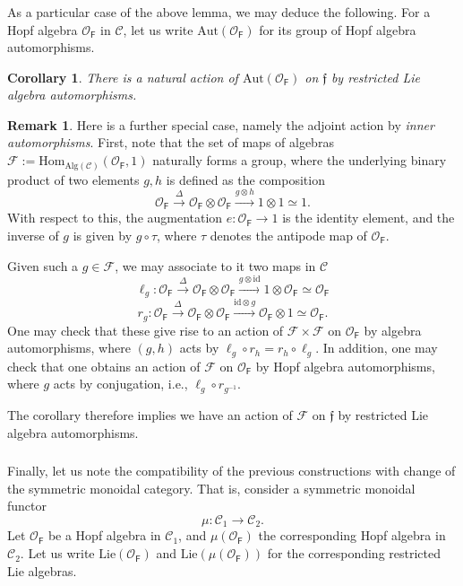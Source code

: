 \documentclass{amsart}
\newtheorem{Cor}[Thm]{Corollary}
\theoremstyle{definition}
\newtheorem{Rem}[Thm]{Remark}
\newcommand{\OOF}{\OO_{\mathsf{F}}}
\newcommand{\sC}{\mathscr{C}}
\newcommand{\sss}{\subsubsection{}}
\newcommand{\OO}{\mathscr{O}}
\newcommand{\Hom}{\on{Hom}}
\newcommand{\on}{\mathrm}
\newcommand{\ff}{\mathfrak{f}}
\numberwithin{equation}{section}
\begin{document}
\sss As a particular case of the above lemma, we may deduce the following. For a Hopf algebra $\OOF$ in $\sC$, let us write $\on{Aut}(\OOF)$ for its group of Hopf algebra automorphisms. 

\begin{Cor}\label{c:ernie} There is a natural action of $\on{Aut}(\OOF)$ on $\ff$ by restricted Lie algebra automorphisms.     
\end{Cor}


\begin{Rem} Here is a further special case, namely the adjoint action by {\em inner automorphisms}. First, note that the set of maps of algebras $\mathscr{F} := \Hom_{\on{Alg}(\sC)}(\OOF, 1)$ naturally forms a group, where the underlying binary product of two elements $g, h$ is defined as the composition 
$$\OOF \xrightarrow{\Delta} \OOF \otimes \OOF \xrightarrow{g \otimes h} 1 \otimes 1 \simeq 1.$$
With respect to this, the augmentation $e: \OOF \rightarrow 1$ is the identity element, and the inverse of $g$ is given by $g \circ \tau$, where $\tau$ denotes the antipode map of $\OOF$.

Given such a $g \in \mathscr{F}$, we may associate to it two maps in $\sC$
$$\ell_g: \OOF \xrightarrow{\Delta} \OOF \otimes \OOF \xrightarrow{g \otimes \on{id}} 1 \otimes \OOF \simeq \OOF$$
$$r_g: \OOF \xrightarrow{\Delta} \OOF \otimes \OOF \xrightarrow{\on{id} \otimes g} \OOF \otimes 1 \simeq \OOF.$$
One may check that these give rise to an action of $\mathscr{F} \times \mathscr{F}$ on $\OOF$ by algebra automorphisms, where $(g,h)$ acts by $\ell_g \circ r_h = r_h \circ \ell_g.$ In addition, one may check that one obtains an action of $\mathscr{F}$ on $\OOF$ by Hopf algebra automorphisms, where $g$ acts by conjugation, i.e., $\ell_g \circ r_{g^{-1}}.$

The corollary therefore implies we have an action of $\mathscr{F}$ on $\ff$ by restricted Lie algebra automorphisms. 
\end{Rem}






\sss Finally, let us note the compatibility of the previous constructions with change of the symmetric monoidal category. That is, consider a symmetric monoidal functor 
$$\mu: \sC_1 \rightarrow \sC_2.$$
Let $\OOF$ be a Hopf algebra in $\sC_1$, and $\mu(\OOF)$ the corresponding Hopf algebra in $\sC_2$. Let us write $\on{Lie}(\OOF)$ and $\on{Lie}(\mu(\OOF))$ for the corresponding restricted Lie algebras. 
\end{document}
